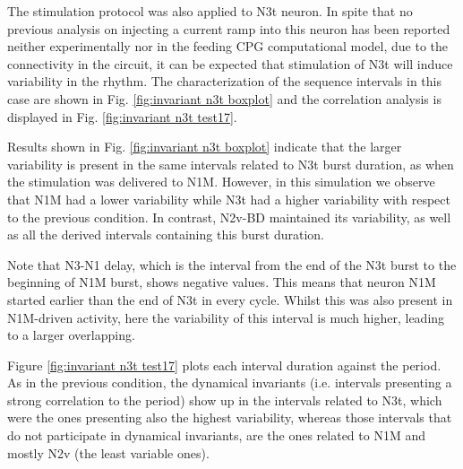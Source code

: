 The stimulation protocol was also applied to N3t neuron. In spite that no previous analysis on injecting a current ramp into this neuron has been reported neither experimentally nor in the feeding CPG computational model, due to the connectivity in the circuit, it can be expected that stimulation of N3t will induce variability in the rhythm. The characterization of the sequence intervals in this case are shown in Fig. 
\ref{fig:invariant n3t boxplot} and the correlation analysis is displayed in Fig. \ref{fig:invariant n3t test17}.


Results shown in Fig. \ref{fig:invariant n3t boxplot} indicate that the larger variability is present in the same intervals related to N3t burst duration, as when the stimulation was delivered to N1M. However, in this simulation we observe that N1M had a lower variability while N3t had a higher variability with respect to the previous condition. 
In contrast, N2v-BD maintained its variability, as well as all the derived intervals containing this burst duration.

Note that N3-N1 delay, which is the interval from the end of the N3t burst to the beginning of N1M burst, shows negative values. This means that neuron N1M started earlier than the end of N3t in every cycle. Whilst this was also present in N1M-driven activity, here the variability of this interval is much higher, leading to a larger overlapping.

Figure \ref{fig:invariant n3t test17} plots each interval duration against the period. As in the previous condition, the dynamical invariants (i.e. intervals presenting a strong correlation to the period) show up in the intervals related to N3t, which were the ones presenting also the highest variability, whereas those intervals that do not participate in dynamical invariants, are the ones related to N1M and mostly N2v (the least variable ones). 



